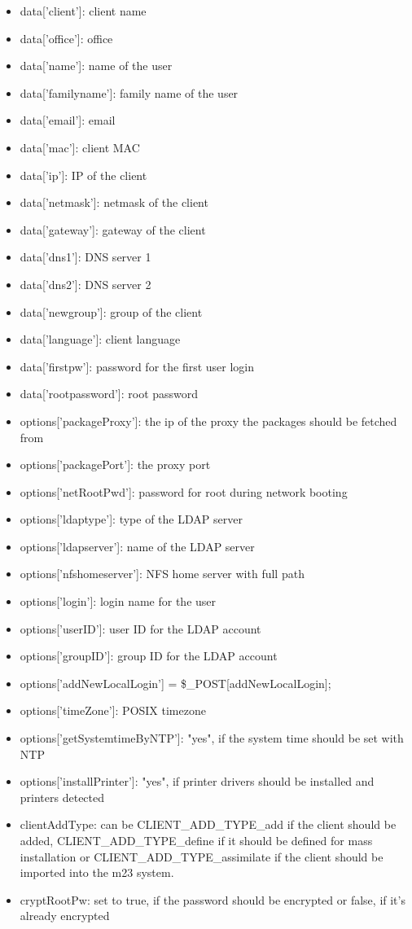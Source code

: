 \begin{itemize}
\item data['client']: client name
\item data['office']: office
\item data['name']: name of the user
\item data['familyname']: family name of the user
\item data['email']: email
\item data['mac']: client MAC
\item data['ip']: IP of the client
\item data['netmask']: netmask of the client
\item data['gateway']: gateway of the client
\item data['dns1']: DNS server 1
\item data['dns2']: DNS server 2
\item data['newgroup']: group of the client
\item data['language']: client language
\item data['firstpw']: password for the first user login
\item data['rootpassword']: root password
\item options['packageProxy']: the ip of the proxy the packages should be fetched from
\item options['packagePort']: the proxy port
\item options['netRootPwd']: password for root during network booting
\item options['ldaptype']: type of the LDAP server
\item options['ldapserver']: name of the LDAP server
\item options['nfshomeserver']: NFS home server with full path
\item options['login']: login name for the user
\item options['userID']: user ID for the LDAP account
\item options['groupID']: group ID for the LDAP account
\item options['addNewLocalLogin']		= \$\_POST[addNewLocalLogin];
\item options['timeZone']: POSIX timezone
\item options['getSystemtimeByNTP']: "yes", if the system time should be set with NTP
\item options['installPrinter']: "yes", if printer drivers should be installed and printers detected
\item clientAddType: can be CLIENT\_ADD\_TYPE\_add if the client should be added, CLIENT\_ADD\_TYPE\_define if it should be defined for mass installation or CLIENT\_ADD\_TYPE\_assimilate if the client should be imported into the m23 system.
\item cryptRootPw: set to true, if the password should be encrypted or false, if it's already encrypted
\end{itemize}


